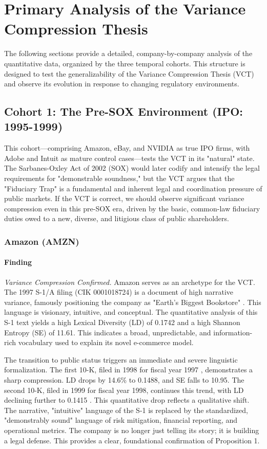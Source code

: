 \documentclass[12pt, letterpaper]{article}
\begin{document}
\clearpage

\section{Primary Analysis of the Variance Compression Thesis}
The following sections provide a detailed, company-by-company analysis of the quantitative data, organized by the three temporal cohorts. This structure is designed to test the generalizability of the Variance Compression Thesis (VCT) and observe its evolution in response to changing regulatory environments.

\subsection{Cohort 1: The Pre-SOX Environment (IPO: 1995-1999)}
This cohort—comprising Amazon, eBay, and NVIDIA as true IPO firms, with Adobe and Intuit as mature control cases—tests the VCT in its "natural" state. The Sarbanes-Oxley Act of 2002 (SOX) would later codify and intensify the legal requirements for "demonstrable soundness," but the VCT argues that the "Fiduciary Trap" is a fundamental and inherent legal and coordination pressure of public markets. If the VCT is correct, we should observe significant variance compression even in this pre-SOX era, driven by the basic, common-law fiduciary duties owed to a new, diverse, and litigious class of public shareholders.

\subsubsection{Amazon (AMZN)}
\paragraph{Finding} \textit{Variance Compression Confirmed.}
Amazon serves as an archetype for the VCT. The 1997 S-1/A filing (CIK 0001018724) is a document of high narrative variance, famously positioning the company as "Earth's Biggest Bookstore" \cite{key1}. This language is visionary, intuitive, and conceptual. The quantitative analysis of this S-1 text yields a high Lexical Diversity (LD) of 0.1742 and a high Shannon Entropy (SE) of 11.61. This indicates a broad, unpredictable, and information-rich vocabulary used to explain its novel e-commerce model.

The transition to public status triggers an immediate and severe linguistic formalization. The first 10-K, filed in 1998 for fiscal year 1997 \cite{key24}, demonstrates a sharp compression. LD drops by 14.6\% to 0.1488, and SE falls to 10.95. The second 10-K, filed in 1999 for fiscal year 1998, continues this trend, with LD declining further to 0.1415 \cite{key25}. This quantitative drop reflects a qualitative shift. The narrative, "intuitive" language of the S-1 is replaced by the standardized, "demonstrably sound" language of risk mitigation, financial reporting, and operational metrics. The company is no longer just telling its story; it is building a legal defense. This provides a clear, foundational confirmation of Proposition 1.
\end{document}
